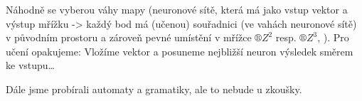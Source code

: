 \documentclass[12pt]{article}					%
\begin{document}
    \begin{definice}[SOM]
        Náhodně se vyberou váhy mapy (neuronové sítě, která má jako vstup vektor a výstup mřížku -> každý bod má (učenou) souřadnici (ve vahách neuronové sítě) v původním prostoru a zároveň pevné umístění v mřížce $®Z^2$ resp. $®Z^3$, ). Pro učení opakujeme: Vložíme vektor a posuneme nejbližší neuron výsledek směrem ke vstupu…
    \end{definice}

    \begin{poznamka}
        Dále jsme probírali automaty a gramatiky, ale to nebude u zkoušky.
    \end{poznamka}
\end{document}
